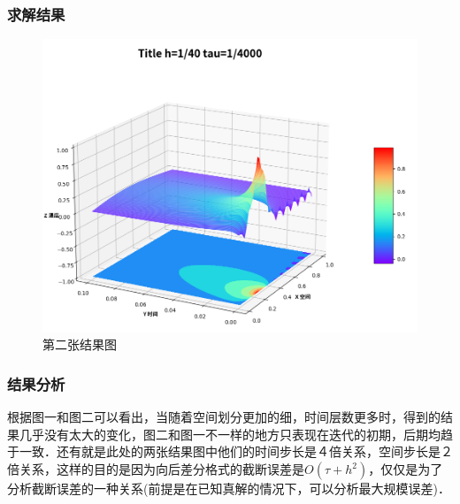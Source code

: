 \documentclass[UTF8]{beamer}
\begin{document}
\begin{frame}[c]\frametitle{求解结果}

\begin{figure}
\centering
\includegraphics[scale=0.25]{3.png}
\caption{第二张结果图}
\end{figure}

\end{frame}

\begin{frame}[t]\frametitle{结果分析}

根据图一和图二可以看出，当随着空间划分更加的细，时间层数更多时，得到的结果几乎没有太大的变化，图二和图一不一样的地方只表现在迭代的初期，后期均趋于一致．还有就是此处的两张结果图中他们的时间步长是４倍关系，空间步长是２倍关系，这样的目的是因为向后差分格式的截断误差是$O(\tau + h^2)$，仅仅是为了分析截断误差的一种关系(前提是在已知真解的情况下，可以分析最大规模误差)．

\end{frame}
\end{document}
